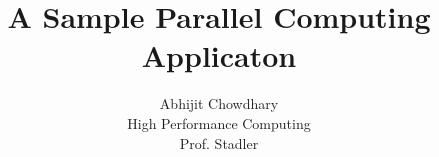 \documentclass[12pt]{article}
\begin{document}
 

 
\title{A Sample Parallel Computing Applicaton}
\author{Abhijit Chowdhary\\ 
High Performance Computing \\
Prof. Stadler} 

\maketitle
\end{document}
